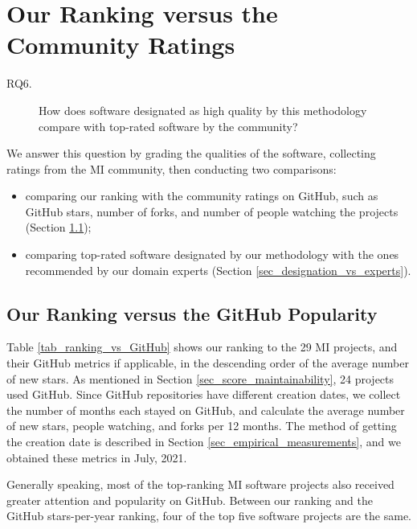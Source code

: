 \section{Our Ranking versus the Community Ratings}
\label{sec_rq_comparison}
\begin{description}
\item[RQ6.] How does software designated as high quality by this methodology compare with top-rated software by the community?
\end{description}

We answer this question by grading the qualities of the software, collecting ratings from the MI community, then conducting two comparisons:
\begin{itemize}
\item comparing our ranking with the community ratings on GitHub, such as GitHub stars, number of forks, and number of people watching the projects (Section \ref{sec_ranking_vs_github});
\item comparing top-rated software designated by our methodology with the ones recommended by our domain experts (Section \ref{sec_designation_vs_experts}).
\end{itemize}

\subsection{Our Ranking versus the GitHub Popularity}
\label{sec_ranking_vs_github}

Table \ref{tab_ranking_vs_GitHub} shows our ranking to the 29 MI projects, and their GitHub metrics if applicable, in the descending order of the average number of new stars. As mentioned in Section \ref{sec_score_maintainability}, 24 projects used GitHub. Since GitHub repositories have different creation dates, we collect the number of months each stayed on GitHub, and calculate the average number of new stars, people watching, and forks per 12 months. The method of getting the creation date is described in Section \ref{sec_empirical_measurements}, and we obtained these metrics in July, 2021.

Generally speaking, most of the top-ranking MI software projects also received greater attention and popularity on GitHub. Between our ranking and the GitHub stars-per-year ranking, four of the top five software projects are the same.

